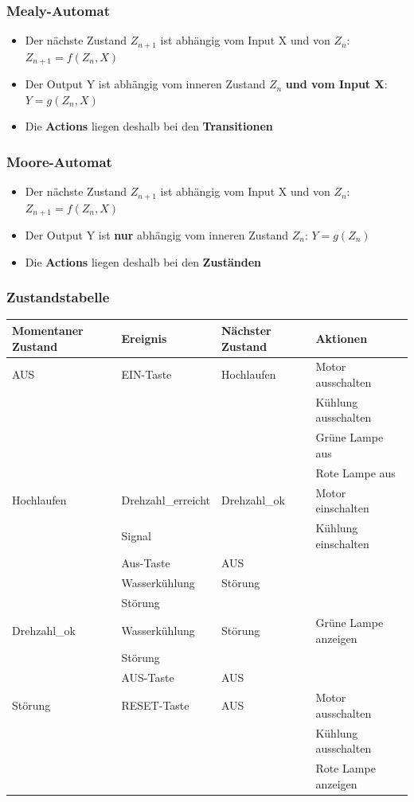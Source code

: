\subsubsection{Mealy-Automat}
\begin{itemize}
  	\item Der nächste Zustand $Z_{n+1}$ ist abhängig vom Input X und von $Z_n$:
  	$Z_{n+1}=f(Z_n,X)$
  	\item Der Output Y ist abhängig vom inneren Zustand $Z_n$ \textbf{und vom
 	 Input X}: $Y=g(Z_n, X)$
  	\item Die \textbf{Actions} liegen deshalb bei den \textbf{Transitionen}
\end{itemize}

\subsubsection{Moore-Automat}
\begin{itemize}
	\item Der nächste Zustand $Z_{n+1}$ ist abhängig vom Input X und von $Z_n$:
  	$Z_{n+1}=f(Z_n,X)$
  	\item Der Output Y ist \textbf{nur} abhängig vom inneren Zustand $Z_n$: $Y=g(Z_n)$
  	\item Die \textbf{Actions} liegen deshalb bei den \textbf{Zuständen}
\end{itemize}


\subsubsection{Zustandstabelle}

\renewcommand{\arraystretch}{1}
\begin{tabular}{|l|l|l|l|}
\hline
\textbf{Momentaner Zustand}&\textbf{Ereignis}&\textbf{Nächster
Zustand}&\textbf{Aktionen}\\
\hline
AUS&EIN-Taste&Hochlaufen&Motor ausschalten\\
&&&Kühlung ausschalten\\&&&Grüne Lampe aus\\&&&Rote Lampe aus\\
\hline
Hochlaufen&Drehzahl\_erreicht&Drehzahl\_ok&Motor einschalten\\
&Signal&&Kühlung einschalten\\ \cline{2-3}
&Aus-Taste&AUS&\\\cline{2-3}
&Wasserkühlung&Störung&\\
&Störung&&\\
\hline
Drehzahl\_ok&Wasserkühlung&Störung&Grüne Lampe anzeigen\\
&Störung&&\\ \cline{2-3}
&AUS-Taste&AUS&\\
\hline
Störung&RESET-Taste&AUS&Motor ausschalten\\
&&&Kühlung ausschalten\\&&&Rote Lampe anzeigen\\
\hline
\end{tabular}
\renewcommand{\arraystretch}{1.8}

